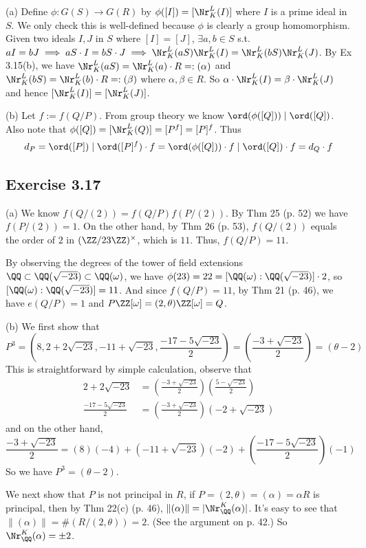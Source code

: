 \documentclass[../Chapter.tex]{subfiles}
\begin{document}
(a) Define $\phi:G(S)\to G(R)$ by $\phi([I])=[\Nr^L_K(I)]$ where $I$ is a prime ideal in $S$. We only check this is well-defined because $\phi$ is clearly a group homomorphism. Given two ideals $I,J$ in $S$ where $[I]=[J]$, $\exists a,b\in S$ s.t. $aI=bJ\implies aS\cdot I=bS\cdot J\implies \Nr^L_K(aS)\Nr^L_K(I)=\Nr^L_K(bS)\Nr^L_K(J)$. By Ex 3.15(b), we have $\Nr^L_K(aS)=\Nr^L_K(a)\cdot R=:(\alpha)$ and $\Nr^L_K(bS)=\Nr^L_K(b)\cdot R=:(\beta)$ where $\alpha,\beta\in R$. So $\alpha\cdot\Nr^L_K(I)=\beta\cdot\Nr^L_K(J)$ and hence $[\Nr^L_K(I)]=[\Nr^L_K(J)]$.

(b) Let $f:=f(Q/P)$. From group theory we know $\ord(\phi([Q]))\mid \ord([Q])$. Also note that $\phi([Q])=[\Nr^L_K(Q)]=[P^f]=[P]^f$. Thus $$d_P=\ord([P])\mid \ord([P]^f)\cdot f = \ord(\phi([Q]))\cdot f\mid \ord([Q])\cdot f=d_Q\cdot f$$

\subsection*{Exercise 3.17}

(a) We know $f(Q/(2))=f(Q/P)f(P/(2))$. By Thm 25 (p. 52) we have $f(P/(2))=1$. On the other hand, by Thm 26 (p. 53), $f(Q/(2))$ equals the order of $2$ in $(\ZZ/23\ZZ)^{\times}$, which is $11$. Thus, $f(Q/P)=11$.

By observing the degrees of the tower of field extensions $\QQ\subset \QQ(\sqrt{-23})\subset \QQ(\omega)$, we have $\phi(23)=22=[\QQ(\omega):\QQ(\sqrt{-23})]\cdot 2$, so $[\QQ(\omega):\QQ(\sqrt{-23})]=11$. And since $f(Q/P)=11$, by Thm 21 (p. 46), we have $e(Q/P)=1$ and $P\ZZ[\omega]=(2,\theta)\ZZ[\omega]=Q$.

(b) We first show that $$P^3=\left(8,2+2\sqrt{-23},-11+\sqrt{-23},\frac{-17-5\sqrt{-23}}{2}\right)=\left(\frac{-3+\sqrt{-23}}{2}\right)=(\theta-2)$$ This is straightforward by simple calculation, observe that
\begin{align*}
2+2\sqrt{-23} &= \left(\frac{-3+\sqrt{-23}}{2}\right)\left(\frac{5-\sqrt{-23}}{2}\right) \\
\frac{-17-5\sqrt{-23}}{2} &= \left(\frac{-3+\sqrt{-23}}{2}\right)(-2+\sqrt{-23})
\end{align*}
and on the other hand, $$\frac{-3+\sqrt{-23}}{2}=(8)(-4)+(-11+\sqrt{-23})(-2)+\left(\frac{-17-5\sqrt{-23}}{2}\right)(-1)$$ So we have $P^3=(\theta-2)$.

We next show that $P$ is not principal in $R$, if $P=(2,\theta)=(\alpha)=\alpha R$ is principal, then by Thm 22(c) (p. 46), $\|(\alpha)\|=|\Nr^K_\QQ(\alpha)|$. It's easy to see that $\|(\alpha)\|=\#(R/(2,\theta))=2$. (See the argument on p. 42.) So $\Nr^K_\QQ(\alpha)=\pm 2$.
\end{document}
